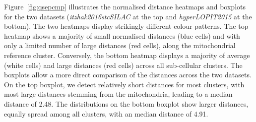 \documentclass[12pt]{article}\usepackage[]{graphicx}\usepackage[]{color}
\begin{document}
Figure~\ref{fig:qsepcmp} illustrates the normalised distance heatmaps
and boxplots for the two datasets (\textit{itzhak2016stcSILAC} at the
top and \textit{hyperLOPIT2015} at the bottom). The two heatmaps
display strikingly different colour patterns. The top heatmap shows a
majority of small normalised distances (blue cells) and with only a
limited number of large distances (red cells), along the mitochondrial
reference cluster. Conversely, the bottom heatmap displays a majority
of average (white cells) and large distances (red cells) across all
sub-cellular clusters. The boxplots allow a more direct comparison of the
distances across the two datasets. On the top boxplot, we detect
relatively short distances for most clusters, with most large
distances stemming from the mitochondria, leading to a median distance
of 2.48. The distributions on the bottom boxplot
show larger distances, equally spread among all clusters, with an
median distance of 4.91.
\end{document}
